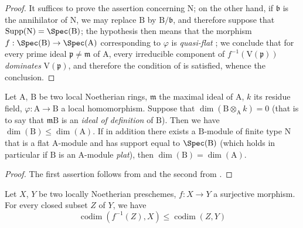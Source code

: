 \begin{proof}
It suffices to prove the assertion concerning $\mathrm{N}$; on the other hand, if $\mathfrak{b}$ is the annihilator of $\mathrm{N}$, we may replace $\mathrm{B}$ by $\mathrm{B}/\mathfrak{b}$, and therefore suppose that $\operatorname{Supp}(\mathrm{N})=\Spec(\mathrm{B})$; the hypothesis then means that the morphism $f:\Spec(\mathrm{B})\to\Spec(\mathrm{A})$ corresponding to $\varphi$ is \emph{quasi-flat} ; we conclude  that for every prime ideal $\mathfrak{p}\neq\mathfrak{m}$ of $\mathrm{A}$,
every irreducible component of $f^{-1}(\mathrm{V}(\mathfrak{p}))$ \emph{dominates} $\mathrm{V}(\mathfrak{p})$, and therefore the condition of  is satisfied, whence the conclusion.
\end{proof}

\begin{corollary}[6.1.3]
\label{IV.6.1.3}
Let $\mathrm{A}$, $\mathrm{B}$ be two local Noetherian rings, $\mathfrak{m}$ the maximal ideal of $\mathrm{A}$, $k$ its residue field, $\varphi:\mathrm{A}\to\mathrm{B}$ a local homomorphism.
Suppose that $\dim(\mathrm{B}\otimes_\mathrm{A} k)=0$ (that is to say  that $\mathfrak{m}\mathrm{B}$ is an \emph{ideal of definition} of $\mathrm{B}$).
Then we have $\dim(\mathrm{B})\leqslant\dim(\mathrm{A})$.
If in addition there exists a $\mathrm{B}$-module of finite type $\mathrm{N}$ that is a flat $\mathrm{A}$-module and has support equal to $\Spec(\mathrm{B})$ (which holds in particular if $\mathrm{B}$ is an $\mathrm{A}$-module \emph{plat}), then $\dim(\mathrm{B})=\dim(\mathrm{A})$.
\end{corollary}

\begin{proof}
The first assertion follows from  and the second from .
\end{proof}

\begin{corollary}[6.1.4]
\label{IV.6.1.4}
Let $X$, $Y$ be two locally Noetherian preschemes, $f:X\to Y$ a surjective morphism.
For every closed subset $Z$ of $Y$, we have
\begin{equation}
  \operatorname{codim}(f^{-1}(Z),X)\leqslant\operatorname{codim}(Z,Y)
  \tag{6.1.4.1}
\end{equation}
\end{corollary}

